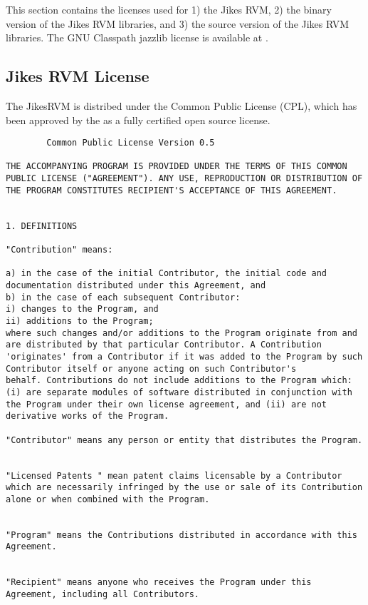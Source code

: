 This section contains the licenses used for 1) the Jikes\trademark
RVM, 2) the binary 
version of the Jikes RVM libraries, and 3) the source version of the
Jikes RVM libraries.  The GNU Classpath jazzlib license is available
at \xlink{{\tt \classpathURL}}{\classpathURL}.  


\subsection{Jikes RVM License}
The Jikes\trademark RVM is distribed under the Common Public License (CPL),
which has been approved by the 
as a fully certified open source license.


\begin{verbatim}
		Common Public License Version 0.5 

THE ACCOMPANYING PROGRAM IS PROVIDED UNDER THE TERMS OF THIS COMMON
PUBLIC LICENSE ("AGREEMENT"). ANY USE, REPRODUCTION OR DISTRIBUTION OF
THE PROGRAM CONSTITUTES RECIPIENT'S ACCEPTANCE OF THIS AGREEMENT.


1. DEFINITIONS 

"Contribution" means: 

a) in the case of the initial Contributor, the initial code and
documentation distributed under this Agreement, and  
b) in the case of each subsequent Contributor:
i) changes to the Program, and
ii) additions to the Program;
where such changes and/or additions to the Program originate from and
are distributed by that particular Contributor. A Contribution
'originates' from a Contributor if it was added to the Program by such
Contributor itself or anyone acting on such Contributor's
behalf. Contributions do not include additions to the Program which:
(i) are separate modules of software distributed in conjunction with
the Program under their own license agreement, and (ii) are not
derivative works of the Program. 

"Contributor" means any person or entity that distributes the Program. 


"Licensed Patents " mean patent claims licensable by a Contributor
which are necessarily infringed by the use or sale of its Contribution
alone or when combined with the Program.  


"Program" means the Contributions distributed in accordance with this
Agreement.  


"Recipient" means anyone who receives the Program under this
Agreement, including all Contributors.  



\end{verbatim}

